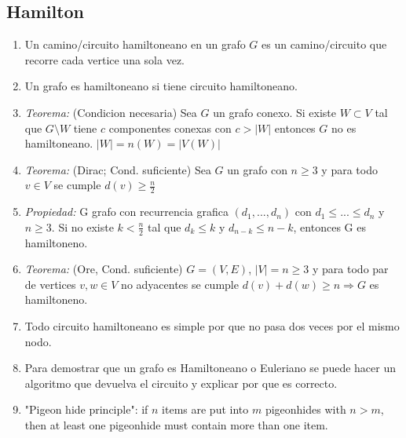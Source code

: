 \subsection{Hamilton}
\begin{enumerate}
\item Un camino/circuito hamiltoneano en un grafo $G$ es un camino/circuito que recorre cada vertice una sola vez.
\item Un grafo es hamiltoneano si tiene circuito hamiltoneano.
\item \textit{Teorema:} (Condicion necesaria) Sea $G$ un grafo conexo. Si existe $ W \subset V$ tal que $G \setminus W$ tiene $c$ componentes conexas con $c > |W|$ entonces $G$ no es hamiltoneano. ${|W| = n(W) = |V(W)| }$
\item \textit{Teorema:} (Dirac; Cond. suficiente) Sea $G$ un grafo con $n \geq 3$ y para todo $v \in V$ se cumple $d(v) \geq \frac{n}{2}$
\item \textit{Propiedad:} G grafo con recurrencia grafica $(d_{1},...,d_{n})$ con $d_{1} \leq ... \leq d_{n}$ y $n \geq 3$. Si no existe $k < \frac{n}{2}$ tal que $d_{k} \leq k$ y $d_{n-k} \leq n-k$, entonces G es hamiltoneno.
\item \textit{Teorema:} (Ore, Cond. suficiente) $G=(V,E)$, $|V| = n \geq 3$ y para todo par de vertices $v,w \in V$ no adyacentes se cumple $d(v)+d(w)\geq n \Rightarrow G$ es hamiltoneno.
\item Todo circuito hamiltoneano es simple por que no pasa dos veces por el mismo nodo.
\item Para demostrar que un grafo es Hamiltoneano o Euleriano se puede hacer un algoritmo que devuelva el circuito y explicar por que es correcto.
\item "Pigeon hide principle": if $n$ items are put into $m$ pigeonhides with $n>m$, then at least one pigeonhide must contain more than one item.
\end{enumerate}
